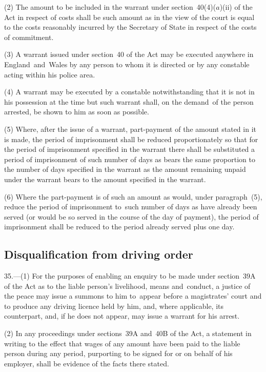 \documentclass[12pt,a4paper]{article}
\begin{document}
(2) The amount to be included in the warrant under section~40(4)($a$)(ii) of the Act in respect of costs shall be such amount as in the view of the court is equal to the costs reasonably incurred by the Secretary of State in respect of the costs of commitment.

(3) A warrant issued under section~40 of the Act may be executed anywhere in England~and~Wales by any person to whom it is directed or by any constable acting within his police area.

(4) A warrant may be executed by a constable notwithstanding that it is not in his possession at the time but such warrant shall, on the demand~of the person arrested, be shown to him as soon as possible.

(5) Where, after the issue of a warrant, part-payment of the amount stated in it is made, the period of imprisonment shall be reduced proportionately so that for the period of imprisonment specified in the warrant there shall be substituted a period of imprisonment of such number of days as bears the same proportion to the number of days specified in the warrant as the amount remaining unpaid under the warrant bears to the amount specified in the warrant.

(6) Where the part-payment is of such an amount as would, under paragraph~(5), reduce the period of imprisonment to~such number of days as have already been served (or would be so served in the course of the day of payment), the period of imprisonment shall be reduced to the period already served plus one day.

\subsection[35. Disqualification from driving order]{Disqualification from driving order}

35.---(1)  For the purposes of enabling an enquiry to be made under section~39A of the Act as to the liable person’s livelihood, means and~conduct, a justice of the peace 
may issue a summons to him to~appear before a magistrates' court and to produce any driving licence held by him, and, where applicable, its counterpart, and, if he does not appear, may issue a warrant for his arrest.

(2) In any proceedings under sections~39A and~40B of the Act, a statement in writing to the effect that wages of any amount have been paid to the liable person during any period, purporting to be signed for or on behalf of his employer, shall be evidence of the facts there stated.
\end{document}
